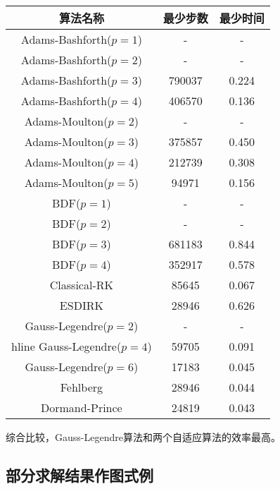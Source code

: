 \documentclass[lang=cn,a4paper,newtx,bibend=bibtex]{elegantpaper}
\begin{document}
\begin{table}[H]
\begin{longtable}{|c|c|c|}
    \hline
    算法名称 & 最少步数 & 最少时间 \\ \hline
    Adams-Bashforth($p=1$) & - & - \\ \hline
    Adams-Bashforth($p=2$) & - & - \\ \hline
    Adams-Bashforth($p=3$) & 790037 & 0.224 \\ \hline
    Adams-Bashforth($p=4$) & 406570 & 0.136 \\ \hline
    Adams-Moulton($p=2$) & - & - \\ \hline
    Adams-Moulton($p=3$) & 375857 & 0.450 \\ \hline
    Adams-Moulton($p=4$) & 212739 & 0.308 \\ \hline
    Adams-Moulton($p=5$) & 94971 & 0.156 \\ \hline
    BDF($p=1$) & - & - \\ \hline
    BDF($p=2$) & - & - \\ \hline
    BDF($p=3$) & 681183 & 0.844 \\ \hline
    BDF($p=4$) & 352917 & 0.578 \\ \hline
    Classical-RK & 85645 & 0.067 \\ \hline
    ESDIRK & 28946 & 0.626 \\ \hline
    Gauss-Legendre($p=2$) & - & - \\ hline
    Gauss-Legendre($p=4$) & 59705 & 0.091 \\ \hline
    Gauss-Legendre($p=6$) & 17183 & 0.045 \\ \hline
    Fehlberg & 28946 & 0.044 \\ \hline
    Dormand-Prince & 24819 & 0.043 \\ \hline
\end{longtable}
\end{table}

综合比较，Gauss-Legendre算法和两个自适应算法的效率最高。

\subsection{部分求解结果作图式例}
\end{document}
